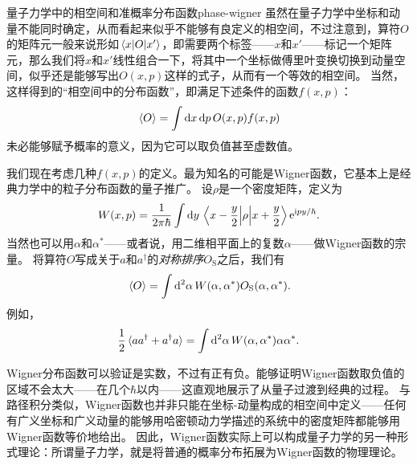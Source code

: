 \begin{back}{量子力学中的相空间和准概率分布函数}{phase-wigner}
    虽然在量子力学中坐标和动量不能同时确定，从而看起来似乎不能够有良定义的相空间，不过注意到，算符$O$的矩阵元一般来说形如$\mel{x}{O}{x'}$，即需要两个标签——$x$和$x'$——标记一个矩阵元，那么我们将$x$和$x'$线性组合一下，将其中一个坐标做傅里叶变换切换到动量空间，似乎还是能够写出$O(x, p)$这样的式子，从而有一个等效的相空间。
    当然，这样得到的“相空间中的分布函数”，即满足下述条件的函数$f(x, p)$：
    \[
        \expval*{O} = \int \dd{x} \dd{p} O(x, p) f(x, p)
    \]
    未必能够赋予概率的意义，因为它可以取负值甚至虚数值。

    我们现在考虑几种$f(x, p)$的定义。最为知名的可能是Wigner函数，它基本上是经典力学中的粒子分布函数的量子推广。
    设$\rho$是一个密度矩阵，定义为
    \begin{equation}
        W(x, p) = \frac{1}{2\pi \hbar} \int \dd{y} \mel{x - \frac{y}{2}}{\rho}{x + \frac{y}{2}} \mathrm{e}^{\mathrm{i} p y / \hbar}.
    \end{equation}
    当然也可以用$\alpha$和$\alpha^*$——或者说，用二维相平面上的复数$\alpha$——做Wigner函数的宗量。
    将算符$O$写成关于$a$和$a^\dagger$的\emph{对称排序}$O_\text{S}$之后，我们有
    \begin{equation}
        \expval*{O} = \int \dd[2]{\alpha} W(\alpha, \alpha^*) O_\text{S}(\alpha, \alpha^*).
    \end{equation}
    例如，
    \begin{equation}
        \frac{1}{2} \expval*{a a^\dagger + a^\dagger a} = \int \dd[2]{\alpha} W(\alpha, \alpha^*) \alpha \alpha^*.
    \end{equation}
    
    Wigner分布函数可以验证是实数，不过有正有负。能够证明Wigner函数取负值的区域不会太大——在几个$\hbar$以内——这直观地展示了从量子过渡到经典的过程。
    与路径积分类似，Wigner函数也并非只能在坐标-动量构成的相空间中定义——任何有广义坐标和广义动量的能够用哈密顿动力学描述的系统中的密度矩阵都能够用Wigner函数等价地给出。
    因此，Wigner函数实际上可以构成量子力学的另一种形式理论：所谓量子力学，就是将普通的概率分布拓展为Wigner函数的物理理论。


\end{back}
